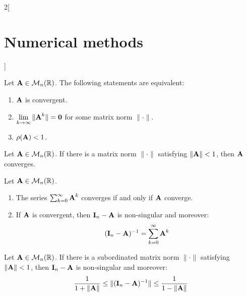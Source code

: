 \documentclass[../../../main_math.tex]{subfiles}
\begin{document}
\begin{multicols}{2}[\section{Numerical methods}]
\begin{definition}
  \end{definition}
  \begin{theorem}
    Let $\boldsymbol{\mathrm{A}}\in\mathcal{M}_n(\mathbb{R})$. The following statements are equivalent:
    \begin{enumerate}
      \item $\boldsymbol{\mathrm{A}}$ is convergent.
      \item $\displaystyle\lim_{k\to\infty}\|\boldsymbol{\mathrm{A}}^k\|=\boldsymbol{\mathrm{0}}$ for some matrix norm $\|\cdot\|$.
      \item $\rho(\boldsymbol{\mathrm{A}})<1$.
    \end{enumerate}
  \end{theorem}
  \begin{corollary}
    Let $\boldsymbol{\mathrm{A}}\in\mathcal{M}_n(\mathbb{R})$. If there is a matrix norm $\|\cdot\|$ satisfying $\|\boldsymbol{\mathrm{A}}\|<1$, then $\boldsymbol{\mathrm{A}}$ converges.
  \end{corollary}
  \begin{theorem}
    Let $\boldsymbol{\mathrm{A}}\in\mathcal{M}_n(\mathbb{R})$.
    \begin{enumerate}
      \item The series $\sum_{k=0}^\infty \boldsymbol{\mathrm{A}}^k$ converges if and only if $\boldsymbol{\mathrm{A}}$ converge.
      \item If $\boldsymbol{\mathrm{A}}$ is convergent, then $\boldsymbol{\mathrm{I}}_n-\boldsymbol{\mathrm{A}}$ is non-singular and moreover: $$(\boldsymbol{\mathrm{I}}_n-\boldsymbol{\mathrm{A}})^{-1}=\sum_{k=0}^\infty\boldsymbol{\mathrm{A}}^k$$
    \end{enumerate}
  \end{theorem}
  \begin{corollary}
    Let $\boldsymbol{\mathrm{A}}\in\mathcal{M}_n(\mathbb{R})$. If there is a subordinated matrix norm $\|\cdot\|$ satisfying $\|\boldsymbol{\mathrm{A}}\|<1$, then $\boldsymbol{\mathrm{I}}_n-\boldsymbol{\mathrm{A}}$ is non-singular and moreover: $$\frac{1}{1+\|\boldsymbol{\mathrm{A}}\|}\leq\|(\boldsymbol{\mathrm{I}}_n-\boldsymbol{\mathrm{A}})^{-1}\|\leq\frac{1}{1-\|\boldsymbol{\mathrm{A}}\|}$$
  \end{corollary}

\end{multicols}
\end{document}
